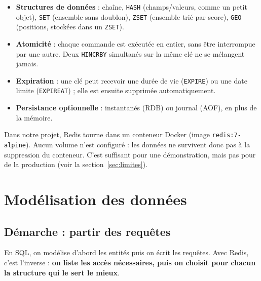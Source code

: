 \documentclass[11pt,a4paper]{article}
\begin{document}
\begin{itemize}
  \item \textbf{Structures de donn\'ees} : cha\^ine, \texttt{HASH} (champs/valeurs, comme un petit objet), \texttt{SET} (ensemble sans doublon), \texttt{ZSET} (ensemble tri\'e par score), \texttt{GEO} (positions, stock\'ees dans un \texttt{ZSET}).
  \item \textbf{Atomicit\'e} : chaque commande est ex\'ecut\'ee en entier, sans \^etre interrompue par une autre. Deux \texttt{HINCRBY} simultan\'es sur la m\^eme cl\'e ne se m\'elangent jamais.
  \item \textbf{Expiration} : une cl\'e peut recevoir une dur\'ee de vie (\texttt{EXPIRE}) ou une date limite (\texttt{EXPIREAT}) ; elle est ensuite supprim\'ee automatiquement.
  \item \textbf{Persistance optionnelle} : instantan\'es (RDB) ou journal (AOF), en plus de la m\'emoire.
\end{itemize}

Dans notre projet, Redis tourne dans un conteneur Docker (image \texttt{redis:7-alpine}). Aucun volume n'est configur\'e : les donn\'ees ne survivent donc pas \`a la suppression du conteneur. C'est suffisant pour une d\'emonstration, mais pas pour de la production (voir la section~\ref{sec:limites}).

\section{Mod\'elisation des donn\'ees}

\subsection{D\'emarche : partir des requ\^etes}
En SQL, on mod\'elise d'abord les entit\'es puis on \'ecrit les requ\^etes. Avec Redis, c'est l'inverse : \textbf{on liste les acc\`es n\'ecessaires, puis on choisit pour chacun la structure qui le sert le mieux}.
\end{document}
